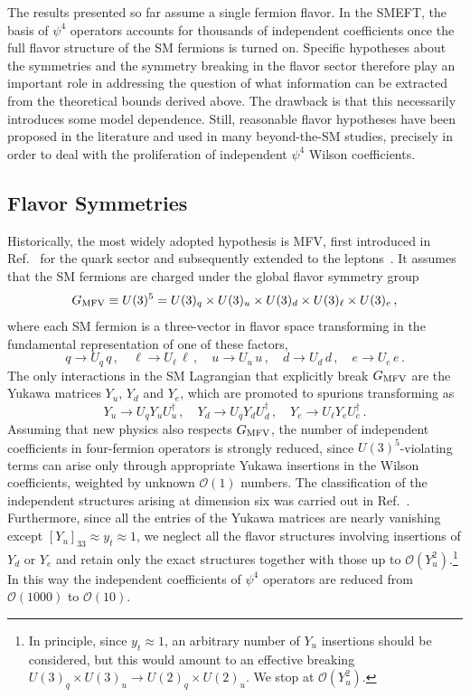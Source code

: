 The results presented so far assume a single fermion flavor. In the SMEFT, the basis of $\psi^4$
operators accounts for thousands of independent coefficients once the full flavor structure of the SM
fermions is turned on. Specific hypotheses about the symmetries and the symmetry breaking in the
flavor sector therefore play an important role in addressing the question of what information can be
extracted from the theoretical bounds derived above. The drawback is that this necessarily introduces
some model dependence. Still, reasonable flavor hypotheses have been proposed in the literature and
used in many beyond-the-SM studies, precisely in order to deal with the proliferation of independent
$\psi^4$ Wilson coefficients.

\subsection{Flavor Symmetries}

Historically, the most widely adopted hypothesis is MFV, first introduced
in Ref.~\cite{DAmbrosio:2002vsn} for the quark sector and subsequently extended to the
leptons~\cite{Cirigliano:2005ck}. It assumes that the SM fermions are charged under the global flavor
symmetry group
\begin{equation}
    G_{\rm MFV}\equiv U(3)^5=U(3)_q\times U(3)_u\times U(3)_d\times U(3)_\ell\times U(3)_e\,,
\end{equation}
where each SM fermion is a three-vector in flavor space transforming in the fundamental
representation of one of these factors,
\begin{equation}
    q\to U_q\, q\,,\quad \ell\to U_\ell\, \ell\,,\quad u\to U_u\, u\,,\quad d\to U_d\, d\,,\quad e\to U_e\, e\,.
\end{equation}
The only interactions in the SM Lagrangian that explicitly break $G_{\rm MFV}$ are the Yukawa
matrices $Y_u$, $Y_d$ and $Y_e$, which are promoted to spurions transforming as
\begin{equation}
    Y_u\to U_q Y_u U_u^\dagger\,,\quad Y_d\to U_q Y_d U_d^\dagger\,,\quad Y_e\to U_\ell Y_e U_e^\dagger\,.
\end{equation}
Assuming that new physics also respects $G_{\rm MFV}$, the number of independent coefficients in
four-fermion operators is strongly reduced, since $U(3)^5$-violating terms can arise only through
appropriate Yukawa insertions in the Wilson coefficients, weighted by unknown $\mathcal O(1)$
numbers. The classification of the independent structures arising at dimension six was carried out in
Ref.~\cite{Faroughy:2020ina}. Furthermore, since all the entries of the Yukawa matrices are nearly
vanishing except $[Y_u]_{33}\approx y_t\approx 1$, we neglect all the flavor structures involving
insertions of $Y_d$ or $Y_e$ and retain only the exact structures together with those up to
$\mathcal O(Y_u^2)$.\footnote{In principle, since $y_t\approx1$, an arbitrary number of $Y_u$
insertions should be considered, but this would amount to an effective breaking $U(3)_q\times U(3)_u\to
U(2)_q\times U(2)_u$. We stop at $\mathcal{O}(Y_u^2)$.} In this way the independent coefficients of
$\psi^4$ operators are reduced from $\mathcal O(1000)$ to $\mathcal O(10)$.

